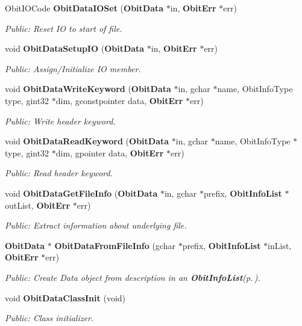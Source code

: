 \begin{CompactItemize}
Obit\-IOCode {\bf Obit\-Data\-IOSet} ({\bf Obit\-Data} $\ast$in, {\bf Obit\-Err} $\ast$err)
\begin{CompactList}\small\item\em Public: Reset IO to start of file. \item\end{CompactList}\item 
void {\bf Obit\-Data\-Setup\-IO} ({\bf Obit\-Data} $\ast$in, {\bf Obit\-Err} $\ast$err)
\begin{CompactList}\small\item\em Public: Assign/Initialize IO member. \item\end{CompactList}\item 
void {\bf Obit\-Data\-Write\-Keyword} ({\bf Obit\-Data} $\ast$in, gchar $\ast$name, Obit\-Info\-Type type, gint32 $\ast$dim, gconstpointer data, {\bf Obit\-Err} $\ast$err)
\begin{CompactList}\small\item\em Public: Write header keyword. \item\end{CompactList}\item 
void {\bf Obit\-Data\-Read\-Keyword} ({\bf Obit\-Data} $\ast$in, gchar $\ast$name, Obit\-Info\-Type $\ast$type, gint32 $\ast$dim, gpointer data, {\bf Obit\-Err} $\ast$err)
\begin{CompactList}\small\item\em Public: Read header keyword. \item\end{CompactList}\item 
void {\bf Obit\-Data\-Get\-File\-Info} ({\bf Obit\-Data} $\ast$in, gchar $\ast$prefix, {\bf Obit\-Info\-List} $\ast$out\-List, {\bf Obit\-Err} $\ast$err)
\begin{CompactList}\small\item\em Public: Extract information about underlying file. \item\end{CompactList}\item 
{\bf Obit\-Data} $\ast$ {\bf Obit\-Data\-From\-File\-Info} (gchar $\ast$prefix, {\bf Obit\-Info\-List} $\ast$in\-List, {\bf Obit\-Err} $\ast$err)
\begin{CompactList}\small\item\em Public: Create Data object from description in an {\bf Obit\-Info\-List}{\rm (p.\,\pageref{structObitInfoList})}. \item\end{CompactList}\item 
void {\bf Obit\-Data\-Class\-Init} (void)
\begin{CompactList}\small\item\em Public: Class initializer. \item\end{CompactList}\end{CompactItemize}


